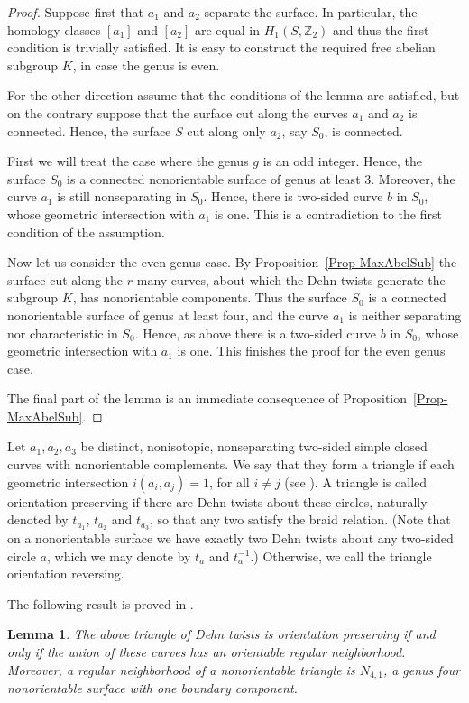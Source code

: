 \documentclass[11 pt]{amsart}
\newtheorem{Lemma}[Theorem]{Lemma}
\theoremstyle{definition}
\begin{document}
\begin{proof}
Suppose first that $a_1$ and $a_2$ separate the surface. In
particular, the homology classes $[a_1]$ and $[a_2]$ are equal in
$H_1(S,{\mathbb Z}_2)$ and thus the first condition is trivially
satisfied. It is easy to construct the required free abelian
subgroup $K$, in case the genus is even.

For the other direction assume that the conditions of the lemma are
satisfied, but on the contrary suppose that the surface cut along
the curves $a_1$ and $a_2$ is connected.  Hence, the surface $S$ cut
along only $a_2$, say $S_0$, is connected.

First we will treat the case where the genus $g$ is an odd integer.
Hence, the surface $S_0$ is a connected nonorientable surface of
genus at least 3. Moreover, the curve $a_1$ is still nonseparating
in $S_0$. Hence, there is two-sided curve $b$ in $S_0$, whose
geometric intersection with $a_1$ is one. This is a contradiction to
the first condition of the assumption.

Now let us consider the even genus case.  By
Proposition~\ref{Prop-MaxAbelSub} the surface cut along the $r$ many
curves, about which the Dehn twists generate the subgroup $K$, has
nonorientable components. Thus the surface $S_0$ is a connected
nonorientable surface of genus at least four, and the curve $a_1$ is
neither separating nor characteristic in $S_0$. Hence, as above
there is a two-sided curve $b$ in $S_0$, whose geometric
intersection with $a_1$ is one. This finishes the proof for the even
genus case.

The final part of the lemma is an immediate consequence of
Proposition~\ref{Prop-MaxAbelSub}.
\end{proof}

Let $a_1,a_2,a_3$ be distinct, nonisotopic, nonseparating two-sided
simple closed curves with nonorientable complements. We say that
they form a triangle if each geometric intersection $i(a_i,a_j)=1$,
for all $i\neq j$ (see \cite{ASzep}).  A triangle is called
orientation preserving if there are Dehn twists about these circles,
naturally denoted by $t_{a_1}$, $t_{a_2}$ and $t_{a_3}$, so that any
two satisfy the braid relation. (Note that on a nonorientable
surface we have exactly two Dehn twists about any two-sided circle
$a$, which we may denote by $t_a$ and $t_a^{-1}$.) Otherwise, we
call the triangle orientation reversing.

The following result is proved in \cite{ASzep}.

\begin{Lemma}\label{Punctured Annulus}
The above triangle of Dehn twists is orientation preserving if and
only if the union of these curves has an orientable regular
neighborhood. Moreover, a regular neighborhood of a nonorientable
triangle is $N_{4,1}$, a genus four nonorientable surface with one
boundary component.
\end{Lemma}
\end{document}
